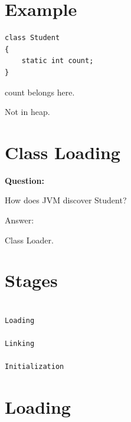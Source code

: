 \documentclass[11pt,a4paper]{book}
\begin{document}
\section{Example}

\begin{verbatim} 
class Student
{
    static int count;
}
\end{verbatim}


count belongs here.


Not in heap.


\section{Class Loading}

\textbf{Question:}


How does JVM discover Student?


Answer:


Class Loader.


\section{Stages}

\begin{verbatim}

Loading

Linking

Initialization

\end{verbatim}


\section{Loading}
\end{document}

